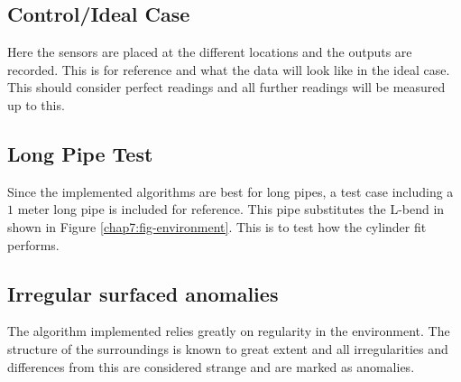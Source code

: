 \subsection{Control/Ideal Case}
Here the sensors are placed at the different locations and the outputs are recorded. This
is for reference and what the data will look like in the ideal case. This should
consider perfect readings and all further readings will be measured up to this.

\subsection{Long Pipe Test}
Since the implemented algorithms are best for long pipes, a test case including a
$1$ meter long pipe is included for reference. This pipe substitutes the L-bend in
shown in Figure \ref{chap7:fig-environment}. This is to test how the cylinder fit
performs. 


\subsection{Irregular surfaced anomalies}
The algorithm implemented relies greatly on regularity in the environment. The structure
of the surroundings is known to great extent and all irregularities and differences from
this are considered strange and are marked as anomalies. 

